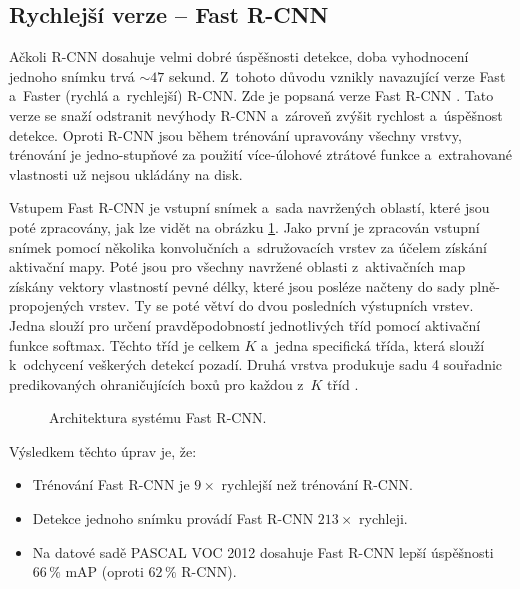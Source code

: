 \subsection*{Rychlejší verze -- Fast R-CNN}
\label{rcnnFast}
Ačkoli R-CNN dosahuje velmi dobré úspěšnosti detekce, doba vyhodnocení jednoho snímku trvá $\sim47$ sekund. Z~tohoto důvodu vznikly navazující verze Fast a~Faster (rychlá a~rychlejší) R-CNN. Zde je popsaná verze Fast R-CNN \cite{fast-rcnn}. Tato verze se snaží odstranit nevýhody R-CNN a~zároveň zvýšit rychlost a~úspěšnost detekce. Oproti R-CNN jsou během trénování upravovány všechny vrstvy, trénování je jedno-stupňové za použití více-úlohové ztrátové funkce a~extrahované vlastnosti už nejsou ukládány na disk.

Vstupem Fast R-CNN je vstupní snímek a~sada navržených oblastí, které jsou poté zpracovány, jak lze vidět na obrázku \ref{fig:fastrcnn}. Jako první je zpracován vstupní snímek pomocí několika konvolučních a~sdružovacích vrstev za účelem získání aktivační mapy. Poté jsou pro všechny navržené oblasti z~aktivačních map získány vektory vlastností pevné délky, které jsou posléze načteny do sady plně-propojených vrstev. Ty se poté větví do dvou posledních výstupních vrstev. Jedna slouží pro určení pravděpodobností jednotlivých tříd pomocí aktivační funkce softmax. Těchto tříd je celkem $K$ a~jedna specifická třída, která slouží k~odchycení veškerých detekcí pozadí. Druhá vrstva produkuje sadu 4 souřadnic predikovaných ohraničujících boxů pro každou z~$K$ tříd \cite{fast-rcnn}.

\begin{figure}[H]
    \centering
    \caption{Architektura systému Fast R-CNN.\footnotemark}
    \label{fig:fastrcnn}
\end{figure}


Výsledkem těchto úprav je, že:

\begin{itemize}
    \item Trénování Fast R-CNN je $9 \times$ rychlejší než trénování R-CNN.
    \item Detekce jednoho snímku provádí Fast R-CNN $213 \times$ rychleji.
    \item Na datové sadě PASCAL VOC 2012 dosahuje Fast R-CNN lepší úspěšnosti $66\,\%$ mAP (oproti $62\,\%$ R-CNN).
\end{itemize}